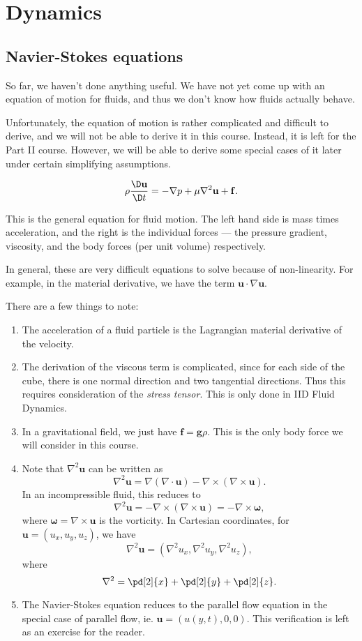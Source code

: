 \documentclass[a4paper]{article}
\begin{document}
\section{Dynamics}
\subsection{Navier-Stokes equations}
So far, we haven't done anything useful. We have not yet come up with an equation of motion for fluids, and thus we don't know how fluids actually behave.

Unfortunately, the equation of motion is rather complicated and difficult to derive, and we will not be able to derive it in this course. Instead, it is left for the Part II course. However, we will be able to derive some special cases of it later under certain simplifying assumptions.
\begin{law}
  \[
    \rho \frac{\D \mathbf{u}}{\D t} = - \nabla p + \mu \nabla^2 \mathbf{u} + \mathbf{f}.
  \]
\end{law}
This is the general equation for fluid motion. The left hand side is mass times acceleration, and the right is the individual forces --- the pressure gradient, viscosity, and the body forces (per unit volume) respectively.

In general, these are very difficult equations to solve because of non-linearity. For example, in the material derivative, we have the term $\mathbf{u} \cdot \nabla \mathbf{u}$.

There are a few things to note:
\begin{enumerate}
  \item The acceleration of a fluid particle is the Lagrangian material derivative of the velocity.
  \item The derivation of the viscous term is complicated, since for each side of the cube, there is one normal direction and two tangential directions. Thus this requires consideration of the \emph{stress tensor}. This is only done in IID Fluid Dynamics.
  \item In a gravitational field, we just have $\mathbf{f} = \mathbf{g}\rho$. This is the only body force we will consider in this course.
  \item Note that $\nabla^2 \mathbf{u}$ can be written as
    \[
      \nabla^2 \mathbf{u} = \nabla (\nabla \cdot \mathbf{u}) - \nabla \times (\nabla \times \mathbf{u}).
    \]
    In an incompressible fluid, this reduces to
    \[
      \nabla^2 \mathbf{u} = -\nabla \times (\nabla \times \mathbf{u}) = -\nabla \times \boldsymbol\omega,
    \]
    where $\boldsymbol\omega = \nabla \times \mathbf{u}$ is the vorticity. In Cartesian coordinates, for $\mathbf{u} = (u_x, u_y, u_z)$, we have
    \[
      \nabla^2 \mathbf{u} = (\nabla^2 u_x, \nabla^2 u_y, \nabla^2 u_z),
    \]
    where
    \[
      \nabla^2 = \pd[2]{x} + \pd[2]{y} + \pd[2]{z}.
    \]
  \item The Navier-Stokes equation reduces to the parallel flow equation in the special case of parallel flow, ie. $\mathbf{u} = (u(y, t), 0, 0)$. This verification is left as an exercise for the reader.
\end{enumerate}
\end{document}
